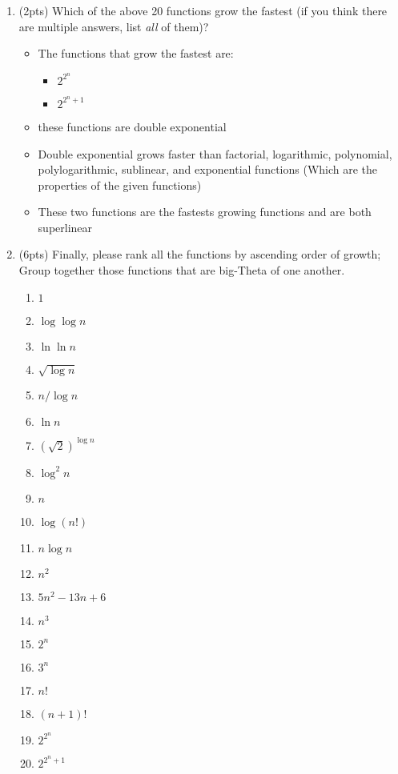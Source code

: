 \documentclass{article}[12pt]
\newcommand\encircle[1]{\raisebox{.5pt}{\textcircled{\raisebox{-.9pt} {\footnotesize #1}}} }
\begin{document}
\begin{enumerate}[label=(\arabic*)]
    \pagebreak
  \item (2pts) Which of the above 20 functions grow the fastest (if you think there are multiple answers, list \emph{all} of them)?
    \begin{itemize}
      \item The functions that grow the fastest are:
        \begin{itemize}
          \item $2^{2^n}$
          \item $2^{2^n+1}$
        \end{itemize}
      \item these functions are double exponential
      \item Double exponential grows faster than factorial, logarithmic, polynomial, polylogarithmic, sublinear, and exponential functions
        (Which are the properties of the given functions)
      \item These two functions are the fastests growing functions and are both superlinear
    \end{itemize}


  \item (6pts) Finally, please rank all the functions by ascending order of growth; Group together those functions that are big-Theta of one another.
\begin{center}
\begin{multicols}{4}
\begin{enumerate}[label=\encircle{\arabic*}]
  \item $1$
  \item $\log \log n$
  \item $\ln\ln n$
  \item $\sqrt{\log n}$
  \item $n/\log n$
  \item $\ln n$
  \item $(\sqrt{2})^{\log n}$
  \item $\log^2n$
  \item $n$
  \item $\log(n!)$
  \item $n\log n$
  \item $n^2$
  \item $5n^2-13n+6$
  \item $n^3$
  \item $2^n$
  \item $3^n$
  \item $n!$
  \item $(n+1)!$
  \item $2^{2^n}$
  \item $2^{2^n+1}$
\end{enumerate}
\end{multicols}
\end{center}

\end{enumerate}
\end{document}
